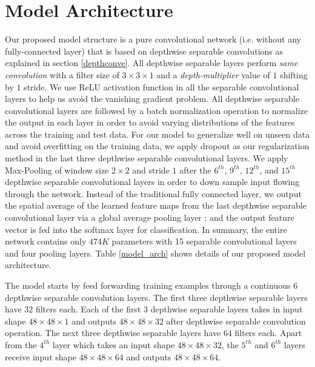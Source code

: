 \documentclass[master]{thesis-uestc}
\begin{document}
\section{Model Architecture}
Our proposed model structure is a pure convolutional network (i.e. without any fully-connected layer) that is based on depthwise separable convolutions as explained in section \ref{depthconve}. All depthwise separable layers perform \textit{same convolution} with a filter size of $3 \times 3 \times 1$ and a \textit{depth-multiplier} value of $1$ shifting by $1$ stride. We use ReLU activation function in all the separable convolutional layers to help us avoid the vanishing gradient problem. All depthwise separable convolutional layers are followed by a batch normalization operation to normalize the output in each layer in order to avoid varying distributions of the features across the training and test data. For our model to generalize well on unseen data and avoid overfitting on the training data, we apply dropout as our regularization method in the last three depthwise separable convolutional layers. We apply Max-Pooling of window size $2 \times 2$ and stride $1$ after the $6^{th}$, $9^{th}$, $12^{th}$, and $15^{th}$ depthwise separable convolutional layers in order to down sample input flowing through the network. Instead of the traditional fully connected layer, we output the spatial average of the learned feature maps from the last depthwise separable convolutional layer via a global average pooling layer ; and the output feature vector is fed into the softmax layer for classification.  In summary, the entire network contains only $474K$ parameters with 15 separable convolutional layers and four pooling layers. Table \ref{model_arch} shows details of our proposed model architecture.

The model starts by feed forwarding training examples through a continuous $6$ depthwise separable convolution layers. The first three depthwise separable layers have $32$ filters each. Each of the first $3$ depthwise separable layers takes in input shape $48 \times 48 \times 1$ and outputs $48 \times 48 \times 32$ after depthwise separable convolution operation. The next three depthwise separable layers have $64$ filters each. Apart from the $4^{th}$ layer which takes an input shape $48 \times 48 \times 32$, the $5^{th}$ and $6^{th}$ layers receive input shape $48 \times 48 \times 64$ and outputs $48 \times 48 \times 64$.
\end{document}

